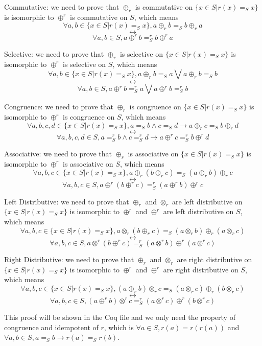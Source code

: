 \documentclass[a4paper,12pt,twoside,openright]{report}
\begin{document}
Commutative: we need to prove that $\oplus_r$ is commutative on $\{x \in S | r(x) =_S x\}$ is isomorphic to $\oplus^r$ is commutative on $S$, which means 
\[\forall a,b \in \{x \in S | r(x) =_S x \}, a \oplus_r b =_S b \oplus_r a \]
\[\longleftrightarrow \]
\[\forall a,b \in S, a \oplus^r b =^r_S b \oplus^r a
\]

Selective: we need to prove that $\oplus_r$ is selective on $\{x \in S | r(x) =_S x\}$ is isomorphic to $\oplus^r$ is selective on $S$, which means 
\[\forall a,b \in \{x \in S | r(x) =_S x\}, a \oplus_r b =_S a \bigvee a \oplus_r b =_S b \]
\[\longleftrightarrow \]
\[\forall a,b \in S, a \oplus^r b =^r_S a \bigvee a \oplus^r b =^r_S b
\]

Congruence: we need to prove that $\oplus_r$ is congruence on $\{x \in S | r(x) =_S x\}$ is isomorphic to $\oplus^r$ is congruence on $S$, which means 
\[\forall a,b,c,d \in \{x \in S | r(x) =_S x \}, a =_S b \wedge c =_S d \rightarrow a \oplus_r c =_S b \oplus_r d \]
\[\longleftrightarrow \]
\[\forall a,b,c,d \in S, a =^r_S b \wedge c =^r_S d \rightarrow a \oplus^r c =^r_S b \oplus^r d
\]

Associative: we need to prove that $\oplus_r$ is associative on $\{x \in S | r(x) =_S x\}$ is isomorphic to $\oplus^r$ is associative on $S$, which means 
\[\forall a,b,c \in \{x \in S | r(x) =_S x \}, a \oplus_r (b \oplus_r c) =_S (a \oplus_r b) \oplus_r c \]
\[\longleftrightarrow \]
\[\forall a,b,c \in S, a \oplus^r (b \oplus^r c) =^r_S (a \oplus^r b) \oplus^r c
\]

Left Distributive: we need to prove that $\oplus_r$ and $\otimes_r$ are left distributive on $\{x \in S | r(x) =_S x\}$ is isomorphic to $\oplus^r$ and $\oplus^r$ are left distributive on $S$, which means 
\[\forall a,b,c \in \{x \in S | r(x) =_S x \}, a \otimes_r (b \oplus_r c) =_S (a \otimes_r b) \oplus_r (a \otimes_r c) \]
\[\longleftrightarrow \]
\[\forall a,b,c \in S, a \otimes^r (b \oplus^r c) =^r_S (a \otimes^r b) \oplus^r (a \otimes^r c)
\]

Right Distributive: we need to prove that $\oplus_r$ and $\otimes_r$ are right distributive on $\{x \in S | r(x) =_S x\}$ is isomorphic to $\oplus^r$ and $\oplus^r$ are right distributive on $S$, which means 
\[\forall a,b,c \in \{x \in S | r(x) =_S x \}, (a \oplus_r b) \otimes_r c =_S (a \otimes_r c) \oplus_r (b \otimes_r c) \]
\[\longleftrightarrow \]
\[\forall a,b,c \in S, (a \oplus^r b) \otimes^r c =^r_S (a \otimes^r c) \oplus^r (b \otimes^r c)
\]

This proof will be shown in the Coq file and we only need the property of congruence and idempotent of $r$, which is $\forall a \in S, r(a) = r(r(a))$ and $\forall a,b \in S, a =_S b \rightarrow r(a) =_S r(b)$.
\end{document}
